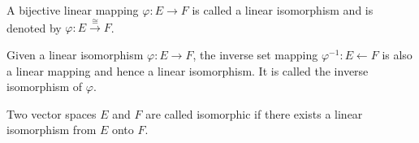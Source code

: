 A bijective linear mapping $\varphi: E \to F$ is called a linear isomorphism and is denoted by $\varphi: E \xrightarrow{\cong} F$.

Given a linear isomorphism $\varphi: E \to F$, the inverse set mapping $\varphi^{-1}: E \leftarrow F$ is also a linear mapping and hence a linear isomorphism. It is called the inverse isomorphism of $\varphi$.

Two vector spaces $E$ and $F$ are called isomorphic if there exists a linear isomorphism from $E$ onto $F$.
